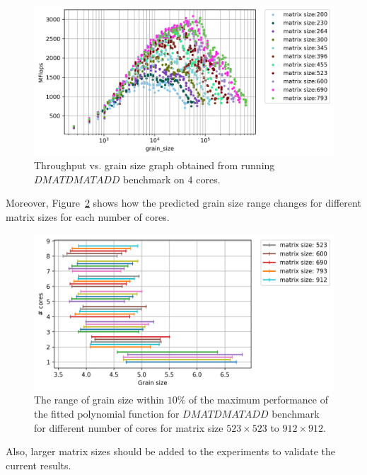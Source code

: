 \vspace{\baselineskip}	
\begin{figure}[H]	
	\centering\includegraphics[scale=.75]{images/fig11.png}			
	\caption{Throughput vs. grain size graph obtained from running $DMATDMATADD$ benchmark  on $4$ cores.}
	\label{fig19}	
\end{figure} 


Moreover, Figure~\ref{fig20} shows how the predicted grain size range changes for different matrix sizes for each number of cores.
 
\vspace{\baselineskip}	
\begin{figure}[H]
	\centering
	\includegraphics[scale=.5]{images/polyfit/fig_523-912_peak_range_all.png}

	\caption{The range of grain size within $10\%$ of the maximum performance of the fitted polynomial function for $DMATDMATADD$ benchmark for different number of cores for matrix size $523\times523$ to $912\times912$.}	
	\label{fig20}
\end{figure} 
\vspace{\baselineskip}	
Also, larger matrix sizes should be added to the experiments to validate the current results. 

